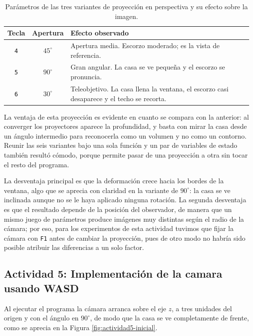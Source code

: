 \begin{table}[H]
\centering
\begin{tabular}{@{}ccp{9.4cm}@{}}
\toprule
\textbf{Tecla} & \textbf{Apertura} & \textbf{Efecto observado} \\
\midrule
\texttt{4} & $45^\circ$ & Apertura media. Escorzo moderado; es la vista de referencia. \\
\texttt{5} & $90^\circ$ & Gran angular. La casa se ve pequeña y el escorzo se pronuncia. \\
\texttt{6} & $30^\circ$ & Teleobjetivo. La casa llena la ventana, el escorzo casi desaparece y el techo se recorta. \\
\bottomrule
\end{tabular}
\caption{Parámetros de las tres variantes de proyección en perspectiva y su efecto sobre la imagen.}
\label{tab:persp}
\end{table}

La ventaja de esta proyección es evidente en cuanto se compara con la anterior:
al converger los proyectores aparece la profundidad, y basta con mirar la casa
desde un ángulo intermedio para reconocerla como un volumen y no como un
contorno. Reunir las seis variantes bajo una sola función y un par de variables
de estado también resultó cómodo, porque permite pasar de una proyección a otra
sin tocar el resto del programa.

La desventaja principal es que la deformación crece hacia los bordes de la
ventana, algo que se aprecia con claridad en la variante de $90^\circ$: la casa
se ve inclinada aunque no se le haya aplicado ninguna rotación. La segunda
desventaja es que el resultado depende de la posición del observador, de manera
que un mismo juego de parámetros produce imágenes muy distintas según el radio
de la cámara; por eso, para los experimentos de esta actividad tuvimos que
fijar la cámara con \texttt{F1} antes de cambiar la proyección, pues de otro
modo no habría sido posible atribuir las diferencias a un solo factor.

\subsection{Actividad 5: Implementación de la camara usando WASD}

Al ejecutar el programa la cámara arranca sobre el eje $z$, a tres unidades del origen y con el ángulo en $90^\circ$, de modo que la casa se ve completamente de frente, como se aprecia en la Figura \ref{fig:actividad5-inicial}.

